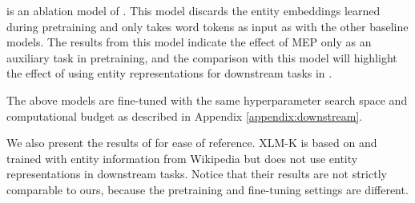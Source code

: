 \documentclass[11pt]{article}
\newcommand{\minisectionNoDot}[1]{\noindent{\bf {#1}}}
\newcommand{\Appendix}[1]{Appendix \ref{#1}}
\begin{document}
\minisectionNoDot{\mlukeW{}} is an ablation model of \mlukeE.
This model discards the entity embeddings learned during pretraining and only takes word tokens as input as with the other baseline models.
The results from this model indicate the effect of MEP only as an auxiliary task in pretraining, and the comparison with this model will highlight the effect of using entity representations for downstream tasks in \mlukeE{}.

The above models are fine-tuned with the same hyperparameter search space and computational budget as described in \Appendix{appendix:downstream}.

We also present the results of {\bf \xlmk{}} \citep{XLM-K-2021-arxiv} for ease of reference.
XLM-K is based on \xlmr{}\ba{} and trained with entity information from Wikipedia but does not use entity representations in downstream tasks.
Notice that their results are not strictly comparable to ours, because the pretraining and fine-tuning settings are different.
\end{document}
